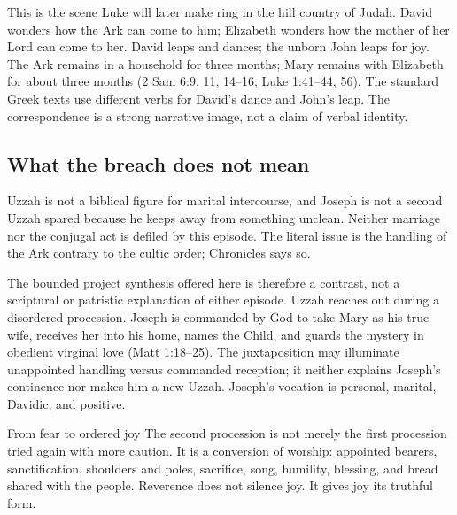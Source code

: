 This is the scene Luke will later make ring in the hill country of Judah.
David wonders how the Ark can come to him; Elizabeth wonders how the mother of
her Lord can come to her.  David leaps and dances; the unborn John leaps for
joy.  The Ark remains in a household for three months; Mary remains with
Elizabeth for about three months (2 Sam 6:9, 11, 14--16; Luke 1:41--44, 56).
The standard Greek texts use different verbs for David's dance and John's
leap.  The correspondence is a strong narrative image, not a claim of verbal
identity.

\subsection{What the breach does not mean}

Uzzah is not a biblical figure for marital intercourse, and Joseph is not a
second Uzzah spared because he keeps away from something unclean.  Neither
marriage nor the conjugal act is defiled by this episode.  The literal issue is
the handling of the Ark contrary to the cultic order; Chronicles says so.

The bounded project synthesis offered here is therefore a contrast, not a
scriptural or patristic explanation of either episode.  Uzzah reaches out
during a disordered procession.  Joseph is commanded by God to take Mary as
his true wife, receives her into his home, names the Child, and guards the
mystery in obedient virginal love (Matt 1:18--25).  The juxtaposition may
illuminate unappointed handling versus commanded reception; it neither
explains Joseph's continence nor makes him a new Uzzah.  Joseph's vocation is
personal, marital, Davidic, and positive.

\begin{studybox}{From fear to ordered joy}
The second procession is not merely the first procession tried again with more
caution.  It is a conversion of worship: appointed bearers, sanctification,
shoulders and poles, sacrifice, song, humility, blessing, and bread shared with
the people.  Reverence does not silence joy.  It gives joy its truthful form.
\end{studybox}
